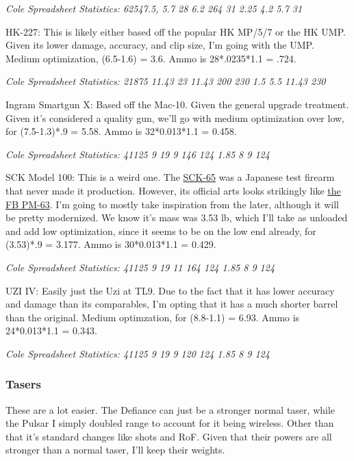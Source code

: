 \begin{multicols*}{2}
	\textit{\textcolor{OliveGreen}{Cole Spreadsheet Statistics:  62547.5, 5.7 28 6.2 264 31 2.25 4.2 5.7 31}}
	
	HK-227: This is likely either based off the popular HK MP/5/7 or the HK UMP. Given its lower damage, accuracy, and clip size, I'm going with the UMP. Medium optimization, (6.5-1.6) = 3.6. Ammo is 28*.0235*1.1 = .724.
	
	\textit{\textcolor{OliveGreen}{Cole Spreadsheet Statistics: 21875 11.43 23 11.43 200 230 1.5 5.5 11.43 230}}
	
	Ingram Smartgun X: Based off the Mac-10. Given the general upgrade treatment. Given it's considered a quality gun, we'll go with medium optimization over low, for (7.5-1.3)*.9 = 5.58. Ammo is 32*0.013*1.1 = 0.458.
	
	\textit{\textcolor{OliveGreen}{Cole Spreadsheet Statistics: 41125 9 19 9 146 124 1.85 8 9 124}}
	
	SCK Model 100: This is a weird one. The \textcolor{Blue}{\href{https://en.wikipedia.org/wiki/New_Nambu_M66}{SCK-65}} was a Japanese test firearm that never made it production. However, its official arts looks strikingly like \textcolor{Blue}{\href{https://en.wikipedia.org/wiki/FB_PM-63}{the FB PM-63}}. I'm going to mostly take inspiration from the later, although it will be pretty modernized. We know it's mass was 3.53 lb, which I'll take as unloaded and add low optimization, since it seems to be on the low end already, for (3.53)*.9 = 3.177. Ammo is 30*0.013*1.1 = 0.429.
	
	\textit{\textcolor{OliveGreen}{Cole Spreadsheet Statistics: 41125 9 19 11 164 124 1.85 8 9 124}}
	
	UZI IV: Easily just the Uzi at TL9. Due to the fact that it has lower accuracy and damage than its comparables, I'm opting that it has a much shorter barrel than the original. Medium optimzation, for (8.8-1.1) = 6.93. Ammo is 24*0.013*1.1 = 0.343.
	
	\textit{\textcolor{OliveGreen}{Cole Spreadsheet Statistics: 41125 9 19 9 120 124 1.85 8 9 124}}
	
	\subsubsection{Tasers}
	
	These are a lot easier. The Defiance can just be a stronger normal taser, while the Pulsar I simply doubled range to account for it being wireless. Other than that it's standard changes like shots and RoF. Given that their powers are all stronger than a normal taser, I'll keep their weights.
	

\end{multicols*}
